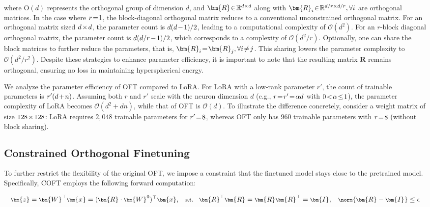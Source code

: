 where $\text{O}(d)$ represents the orthogonal group of dimension $d$, and $\thickmuskip=2mu \medmuskip=2mu \bm{R}\in\mathbb{R}^{d\times d}$ along with $\thickmuskip=2mu \medmuskip=2mu \bm{R}_i\in\mathbb{R}^{d/r\times d/r}, \forall i$ are orthogonal matrices. In the case where $\thickmuskip=2mu \medmuskip=2mu r=1$, the block-diagonal orthogonal matrix reduces to a conventional unconstrained orthogonal matrix. For an orthogonal matrix sized $\thickmuskip=2mu \medmuskip=2mu d\times d$, the parameter count is $\thickmuskip=2mu \medmuskip=2mu d(d-1)/2$, leading to a computational complexity of $\mathcal{O}(d^2)$. For an $r$-block diagonal orthogonal matrix, the parameter count is $\thickmuskip=2mu \medmuskip=2mu d(d/r-1)/2$, which corresponds to a complexity of $\mathcal{O}(d^2/r)$. Optionally, one can share the block matrices to further reduce the parameters, that is, $\thickmuskip=2mu \medmuskip=2mu \bm{R}_i=\bm{R}_j,\forall i \neq j$. This sharing lowers the parameter complexity to $\mathcal{O}(d^2/r^2)$. Despite these strategies to enhance parameter efficiency, it is important to note that the resulting matrix $\bm{R}$ remains orthogonal, ensuring no loss in maintaining hyperspherical energy.

We analyze the parameter efficiency of OFT compared to LoRA. For LoRA with a low-rank parameter $r'$, the count of trainable parameters is $\thickmuskip=2mu \medmuskip=2mu r'(d+n)$. Assuming both $r$ and $r'$ scale with the neuron dimension $d$ (e.g., $\thickmuskip=2mu \medmuskip=2mu r = r' = \alpha d$ with $\thickmuskip=2mu \medmuskip=2mu 0 < \alpha \leq 1$), the parameter complexity of LoRA becomes $\mathcal{O}(d^2 + d n)$, while that of OFT is $\mathcal{O}(d)$. To illustrate the difference concretely, consider a weight matrix of size $\thickmuskip=2mu \medmuskip=2mu 128 \times 128$: LoRA requires $2,048$ trainable parameters for $\thickmuskip=2mu \medmuskip=2mu r' = 8$, whereas OFT only has $960$ trainable parameters with $\thickmuskip=2mu \medmuskip=2mu r = 8$ (without block sharing).

\subsection{Constrained Orthogonal Finetuning}

To further restrict the flexibility of the original OFT, we impose a constraint that the finetuned model stays close to the pretrained model. Specifically, COFT employs the following forward computation:

\begin{equation}\label{eq:coft_general}
    \footnotesize
    \bm{z} = \bm{W}^\top \bm{x} = (\bm{R} \cdot \bm{W}^0)^\top \bm{x}, \quad \text{s.t.} \quad \bm{R}^\top \bm{R} = \bm{R} \bm{R}^\top = \bm{I}, \quad \norm{\bm{R} - \bm{I}} \leq \epsilon
\end{equation}

